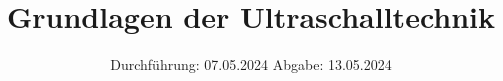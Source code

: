 

\subject{US1}
\title{Grundlagen der Ultraschalltechnik}
\date{%
  Durchführung: 07.05.2024
  \hspace{3em}
  Abgabe: 13.05.2024
}



\maketitle
\thispagestyle{empty}
\tableofcontents
\newpage






\printbibliography{}

